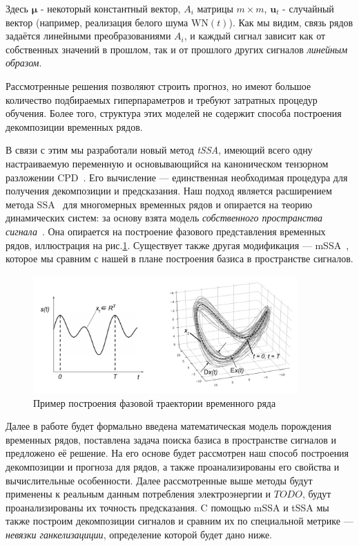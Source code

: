 		Здесь $ \boldsymbol{\mu} $ - некоторый константный вектор, $ A_i $ матрицы $ m \times m $, $ \mathbf{u}_t $ - случайный вектор (например, реализация белого шума $ \text{WN}(t) $). Как мы видим, связь рядов задаётся линейными преобразованиями $ A_i $, и каждый сигнал зависит как от собственных значений в прошлом, так и от прошлого других сигналов \textit{линейным образом}. 	
		
		Рассмотренные решения позволяют строить прогноз, но имеют большое количество подбираемых гиперпараметров и требуют затратных процедур обучения. Более того, структура этих моделей не содержит способа построения декомпозиции временных рядов. 
		
		В связи с этим мы разработали новый метод \emph{tSSA}, имеющий всего одну настраиваемую переменную и основывающийся на каноническом тензорном разложении CPD~\cite{kolda_tensors}. Его вычисление --- единственная необходимая процедура для получения декомпозиции и предсказания. Наш подход является расширением метода SSA~\cite{ecfb9dc578be43ae9ee8fc88b8ff9151} для многомерных временных рядов и опирается на теорию динамических систем: за основу взята модель \textit{собственного пространства сигнала}~\cite{1572261550523548160}. Она опирается на построение фазового представления временных рядов, иллюстрация на рис.\ref{pic:phase_traj}. Существует также другая модификация --- mSSA~\cite{mSSA_overview}, которое мы сравним с нашей в плане построения базиса в пространстве сигналов.
		
		\begin{figure}[h]
			\centering
			\includegraphics[width=0.9\textwidth, keepaspectratio]{../figs/phase_traj.png}
			\caption{Пример построения фазовой траектории временного ряда}\label{pic:phase_traj}
		\end{figure}
		
		Далее в работе будет формально введена математическая модель порождения временных рядов, поставлена задача поиска базиса в пространстве сигналов и предложено её решение. На его основе будет рассмотрен наш способ построения декомпозиции и прогноза для рядов, а также проанализированы его свойства и вычислительные особенности. Далее рассмотренные выше методы будут применены к реальным данным потребления электроэнергии и $ TODO $, будут проанализированы их точность предсказания. C помощью mSSA и tSSA мы также построим декомпозиции сигналов и сравним их по специальной метрике --- \emph{невязки ганкелизациции}, определение которой будет дано ниже.
		 
